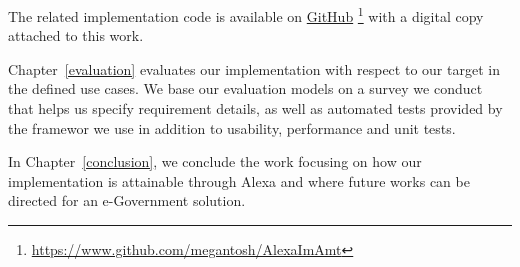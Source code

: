 The related implementation code is available on \href{https://www.github.com/megantosh/AlexaImAmt}{GitHub} \footnote{\url{https://www.github.com/megantosh/AlexaImAmt} 
} with a digital copy attached to this work. 

Chapter~\ref{evaluation} evaluates our implementation with respect to our target in the defined %
use cases. We base our evaluation models on a survey we conduct that helps us specify requirement details, as well as automated tests provided by the framewor we use in addition to usability, performance and unit tests. 

In Chapter~\ref{conclusion}, we conclude the work focusing on how our implementation %
is attainable through Alexa and where future works can be directed for an e-Government solution.
